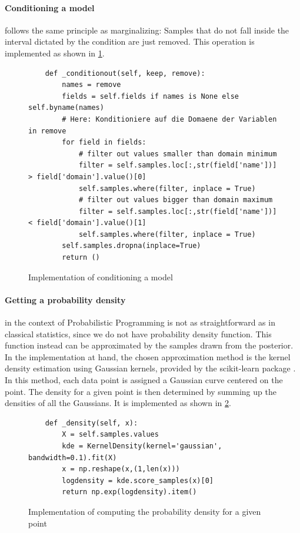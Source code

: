 \documentclass{article}
\begin{document}
\paragraph{Conditioning a model} follows the same principle as marginalizing: Samples that do not fall inside the interval dictated by the condition are just removed. This operation is implemented as shown in \ref{fig:code_conditioning_a_model}.
\begin{figure}[h]
	\begin{lstlisting}
    def _conditionout(self, keep, remove):
		names = remove
		fields = self.fields if names is None else self.byname(names)
		# Here: Konditioniere auf die Domaene der Variablen in remove
		for field in fields:
			# filter out values smaller than domain minimum
			filter = self.samples.loc[:,str(field['name'])] > field['domain'].value()[0]
			self.samples.where(filter, inplace = True)
			# filter out values bigger than domain maximum
			filter = self.samples.loc[:,str(field['name'])] < field['domain'].value()[1]
			self.samples.where(filter, inplace = True)
		self.samples.dropna(inplace=True)
		return ()
	\end{lstlisting}
	\caption[Implementation of conditioning a model]{Implementation of conditioning a model}
	\label{fig:code_conditioning_a_model}
\end{figure}

\paragraph{Getting a probability density} in the context of Probabilistic Programming is not as straightforward as in classical statistics, since we do not have probability density function. This function instead can be approximated by the samples drawn from the posterior. In the implementation at hand, the chosen approximation method is the kernel density estimation using Gaussian kernels, provided by the scikit-learn package \cite{scikit-learn}. In this method, each data point is assigned a Gaussian curve centered on the point. The density for a given point is then determined by summing up the densities of all the Gaussians. It is implemented as shown in \ref{fig:code_probability_density}.
\begin{figure}[h]
	\begin{lstlisting}
    def _density(self, x):
		X = self.samples.values
		kde = KernelDensity(kernel='gaussian', bandwidth=0.1).fit(X)
		x = np.reshape(x,(1,len(x)))
		logdensity = kde.score_samples(x)[0]
		return np.exp(logdensity).item()
	\end{lstlisting}
	\caption[Implementation of computing the probability density for a given point]{Implementation of computing the probability density for a given point}
	\label{fig:code_probability_density}
\end{figure}
\end{document}
